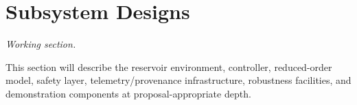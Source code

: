 \section{Subsystem Designs}
\label{sec:subsystems}

\textit{Working section.}

This section will describe the reservoir environment, controller, reduced-order model,
safety layer, telemetry/provenance infrastructure, robustness facilities, and
demonstration components at proposal-appropriate depth.
